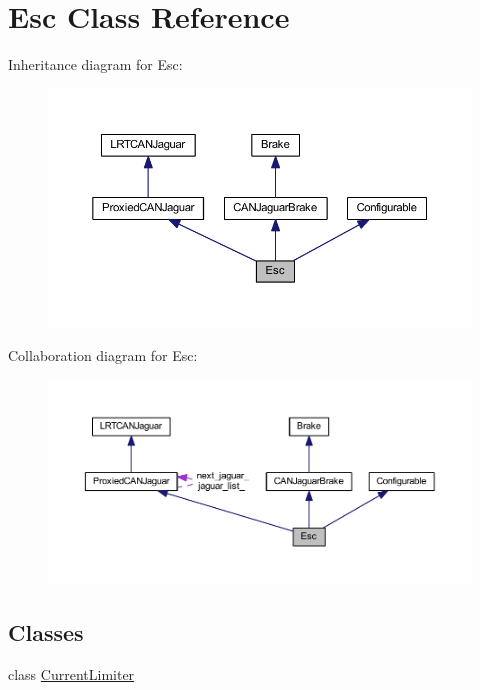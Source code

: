 \hypertarget{class_esc}{
\section{\-Esc \-Class \-Reference}
\label{class_esc}
}


\-Inheritance diagram for \-Esc\-:\nopagebreak
\begin{figure}[H]
\begin{center}
\leavevmode
\includegraphics[width=350pt]{class_esc__inherit__graph}
\end{center}
\end{figure}


\-Collaboration diagram for \-Esc\-:\nopagebreak
\begin{figure}[H]
\begin{center}
\leavevmode
\includegraphics[width=350pt]{class_esc__coll__graph}
\end{center}
\end{figure}
\subsection*{\-Classes}
\begin{DoxyCompactItemize}
\item 
class \hyperlink{class_esc_1_1_current_limiter}{\-Current\-Limiter}
\end{DoxyCompactItemize}
